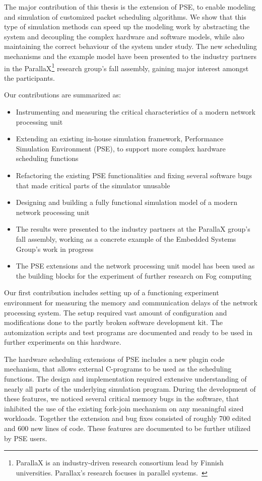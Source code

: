 The major contribution of this thesis is the extension of PSE, to enable modeling and simulation of customized packet scheduling algorithms. We show that this type of simulation methods can speed up the modeling work by abstracting the system and decoupling the complex hardware and software models, while also maintaining the correct behaviour of the system under study. The new scheduling mechanisms and the example model have been presented to the industry partners in the ParallaX\footnote{ParallaX is an industry-driven research consortium lead by Finnish universities. Parallax's research focuses in parallel systems.~\cite{Lilius:2012:ParallaX}} research group's fall assembly, gaining major interest amongst the participants.

Our contributions are summarized as:
\begin{itemize}
\item Instrumenting and measuring the critical characteristics of a modern network processing unit
\item Extending an existing in-house simulation framework, Performance Simulation Environment (PSE), to support more complex hardware scheduling functions
\item Refactoring the existing PSE functionalities and fixing several software bugs that made critical parts of the simulator unusable
\item Designing and building a fully functional simulation model of a modern network processing unit
\item The results were presented to the industry partners at the ParallaX group's fall assembly, working as a concrete example of the Embedded Systems Group's work in progress
\item The PSE extensions and the network processing unit model has been used as the building blocks for the experiment of further research on Fog computing
\end{itemize}

Our first contribution includes setting up of a functioning experiment environment for measuring the memory and communication delays of the network processing system. The setup required vast amount of configuration and modifications done to the partly broken software development kit. The automization scripts and test programs are documented and ready to be used in further experiments on this hardware.

The hardware scheduling extensions of PSE includes a new plugin code mechanism, that allows external C-programs to be used as the scheduling functions. The design and implementation required extensive understanding of nearly all parts of the underlying simulation program. During the development of these features, we noticed several critical memory bugs in the software, that inhibited the use of the existing fork-join mechanism on any meaningful sized workloads. Together the extension and bug fixes consisted of roughly 700 edited and 600 new lines of code. These features are documented to be further utilized by PSE users.

